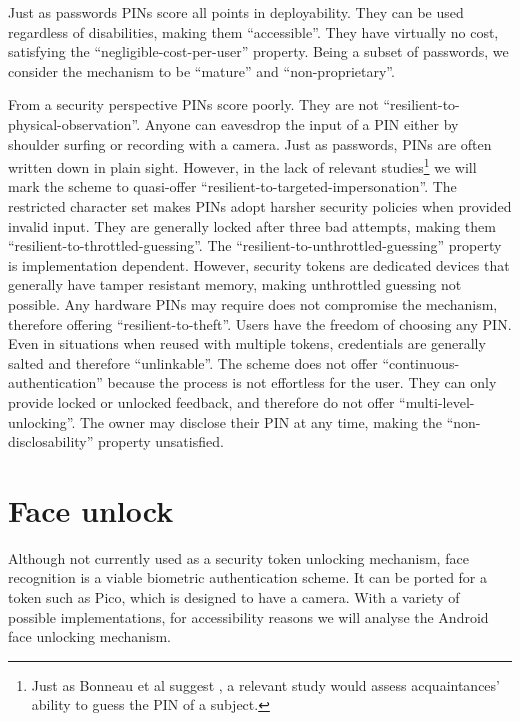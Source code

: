 Just as passwords PINs score all points in deployability. They can be used regardless of disabilities, making them ``accessible''. They have virtually no cost, satisfying the ``negligible-cost-per-user'' property. Being a subset of passwords, we consider the mechanism to be ``mature'' and ``non-proprietary''.
	
From a security perspective PINs score poorly. They are not ``resilient-to-physical-observation''. Anyone can eavesdrop the input of a PIN either by shoulder surfing or recording with a camera. Just as passwords, PINs are often written down in plain sight. However, in the lack of relevant studies\footnote{Just as Bonneau et al suggest \cite{bonneau2012quest}, a relevant study would assess acquaintances' ability to guess the PIN of a subject.} we will mark the scheme to quasi-offer ``resilient-to-targeted-impersonation''. The restricted character set makes PINs adopt harsher security policies when provided invalid input. They are generally locked after three bad attempts, making them ``resilient-to-throttled-guessing''. The ``resilient-to-unthrottled-guessing'' property is implementation dependent. However, security tokens are dedicated devices that generally have tamper resistant memory, making unthrottled guessing not possible. Any hardware PINs may require does not compromise the mechanism, therefore offering ``resilient-to-theft''. Users have the freedom of choosing any PIN. Even in situations when reused with multiple tokens, credentials are generally salted and therefore ``unlinkable''. The scheme does not offer ``continuous-authentication'' because the process is not effortless for the user. They can only provide locked or unlocked feedback, and therefore do not offer ``multi-level-unlocking''. The owner may disclose their PIN at any time, making the ``non-disclosability'' property unsatisfied. 
	
%
%
\section{Face unlock}
Although not currently used as a security token unlocking mechanism, face recognition is a viable biometric authentication scheme. It can be ported for a token such as Pico, which is designed to have a camera. With a variety of possible implementations, for accessibility reasons we will analyse the Android face unlocking mechanism.
	
